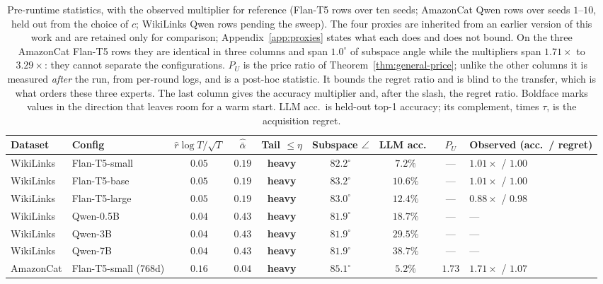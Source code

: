\documentclass{article}
\theoremstyle{definition}
\theoremstyle{remark}
\theoremstyle{remark}
\begin{document}
\begin{table}[h]
\centering
\caption{Pre-runtime statistics, with the observed multiplier for reference
(Flan-T5 rows over ten seeds; AmazonCat Qwen rows over seeds $1$--$10$, held
out from the choice of $c$; WikiLinks Qwen rows pending the sweep). The four proxies are inherited from an
earlier version of this work and are retained only for comparison;
Appendix~\ref{app:proxies} states what each does and does not bound. On the
three AmazonCat Flan-T5 rows they are identical in three columns and span
$1.0^\circ$ of subspace angle while the multipliers span $1.71\times$ to
$3.29\times$: they cannot separate the configurations. $P_U$ is the price
ratio of Theorem~\ref{thm:general-price}; unlike the other columns it is
measured \emph{after} the run, from per-round logs, and is a post-hoc
statistic. It bounds the regret ratio and is blind to the transfer, which is
what orders these three experts. The last column gives the accuracy multiplier
and, after the slash, the regret ratio. Boldface marks values in the direction
that leaves room for a warm start. LLM acc.\ is held-out top-1 accuracy; its
complement, times $\tau$, is the acquisition regret. }
\label{tab:diagnostics}
\scriptsize
\setlength{\tabcolsep}{3pt}
\begin{tabular}{@{}llccccccl@{}}
\toprule
Dataset & Config & $\widehat r\log T/\sqrt T$ & $\widehat{\bar\alpha}$ & Tail $\le\eta$ & Subspace $\angle$ & LLM acc.\ & $P_U$ & Observed (acc.\ / regret) \\
\midrule
WikiLinks & Flan-T5-small  & $0.05$ & $0.19$ & \textbf{heavy} & $\mathbf{82.2^\circ}$ & $7.2\%$ & --- & $1.01\times$ / $1.00$ \\
WikiLinks & Flan-T5-base   & $0.05$ & $0.19$ & \textbf{heavy} & $\mathbf{83.2^\circ}$ & $10.6\%$ & --- & $1.01\times$ / $1.00$ \\
WikiLinks & Flan-T5-large  & $0.05$ & $0.19$ & \textbf{heavy} & $\mathbf{83.0^\circ}$ & $12.4\%$ & --- & $0.88\times$ / $0.98$ \\
WikiLinks & Qwen-0.5B      & $0.04$ & $0.43$ & \textbf{heavy} & $\mathbf{81.9^\circ}$ & $18.7\%$ & --- & --- \\
WikiLinks & Qwen-3B        & $0.04$ & $0.43$ & \textbf{heavy} & $\mathbf{81.9^\circ}$ & $29.5\%$ & --- & --- \\
WikiLinks & Qwen-7B        & $0.04$ & $0.43$ & \textbf{heavy} & $\mathbf{81.9^\circ}$ & $38.7\%$ & --- & --- \\
\midrule
AmazonCat & Flan-T5-small (768d) & $\mathbf{0.16}$ & $\mathbf{0.04}$ & \textbf{heavy} & $\mathbf{85.1^\circ}$ & $5.2\%$ & $1.73$ & $1.71\times$ / $1.07$ \\

\end{tabular}
\end{table}
\end{document}
